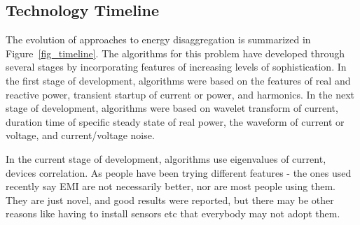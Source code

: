 \subsection{Technology Timeline}
The evolution of approaches to energy disaggregation is summarized in Figure~\ref{fig_timeline}.  
The algorithms for this problem  have developed through several stages by incorporating 
features of increasing levels of sophistication. 
In the first stage of development, algorithms were based
on the features of real and reactive power, transient startup of current or power, and 
harmonics. In the next stage of development, algorithms were based on wavelet
transform of current, 
duration time of specific steady state of real power, the waveform of current or voltage, 
and current/voltage noise. 

  In the current stage of development, algorithms use eigenvalues of current, devices correlation. 
  As people have been trying different
  features - the ones used recently say EMI are not necessarily better, nor
  are most people using them. They are just novel, and good results were
  reported, but there may be other reasons like having to install sensors etc that
  everybody may not adopt them.
  


